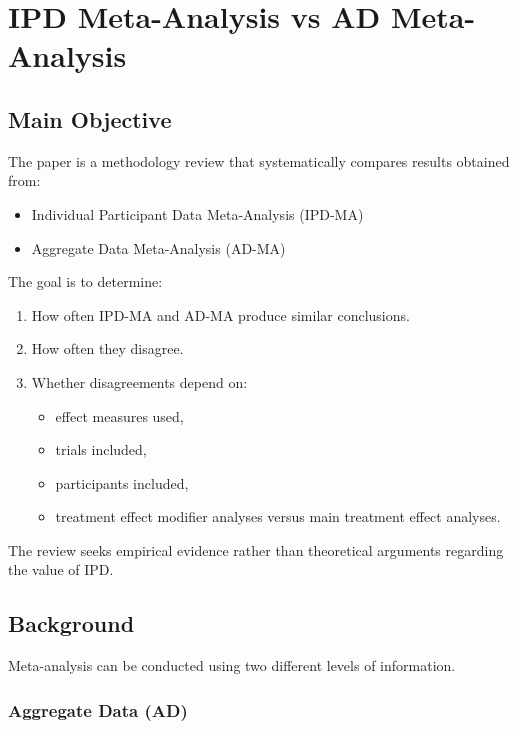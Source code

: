 \documentclass[11pt]{article}
\begin{document}
\section{IPD Meta-Analysis vs AD Meta-Analysis}

\subsection*{Main Objective}

The paper is a methodology review that systematically compares results obtained from:

\begin{itemize}
    \item Individual Participant Data Meta-Analysis (IPD-MA)
    \item Aggregate Data Meta-Analysis (AD-MA)
\end{itemize}

The goal is to determine:

\begin{enumerate}
    \item How often IPD-MA and AD-MA produce similar conclusions.
    \item How often they disagree.
    \item Whether disagreements depend on:
    \begin{itemize}
        \item effect measures used,
        \item trials included,
        \item participants included,
        \item treatment effect modifier analyses versus main treatment effect analyses.
    \end{itemize}
\end{enumerate}

The review seeks empirical evidence rather than theoretical arguments regarding the value of IPD.

\subsection*{Background}

Meta-analysis can be conducted using two different levels of information.

\subsubsection*{Aggregate Data (AD)}
\end{document}

